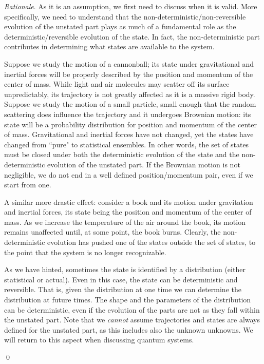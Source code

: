 \documentclass[aps,pra,10pt,twocolumn,floatfix,nofootinbib]{revtex4-1}
\numberwithin{equation}{section}
\theoremstyle{definition}
\newenvironment{rationale}{\emph{Rationale}.}{\qed}
\begin{document}
\begin{rationale}
As it is an assumption, we first need to discuss when it is valid. More specifically, we need to understand that the non-deterministic/non-reversible evolution of the unstated part plays as much of a fundamental role as the deterministic/reversible evolution of the state. In fact, the non-deterministic part contributes in determining what states are available to the system.

Suppose we study the motion of a cannonball; its state under gravitational and inertial forces will be properly described by the position and momentum of the center of mass. While light and air molecules may scatter off its surface unpredictably, its trajectory is not greatly affected as it is a massive rigid body. Suppose we study the motion of a small particle, small enough that the random scattering does influence the trajectory and it undergoes Brownian motion: its state will be a probability distribution for position and momentum of the center of mass. Gravitational and inertial forces have not changed, yet the states have changed from ``pure" to statistical ensembles. In other words, the set of states must be closed under both the deterministic evolution of the state and the non-deterministic evolution of the unstated part. If the Brownian motion is not negligible, we do not end in a well defined position/momentum pair, even if we start from one.

A similar more drastic effect: consider a book and its motion under gravitation and inertial forces, its state being the position and momentum of the center of mass. As we increase the temperature of the air around the book, its motion remains unaffected until, at some point, the book burns. Clearly, the non-deterministic evolution has pushed one of the states outside the set of states, to the point that the system is no longer recognizable.

As we have hinted, sometimes the state is identified by a distribution (either statistical or actual). Even in this case, the state can be deterministic and reversible. That is, given the distribution at one time we can determine the distribution at future times. The shape and the parameters of the distribution can be deterministic, even if the evolution of the parts are not as they fall within the unstated part. Note that we \emph{cannot} assume trajectories and states are always defined for the unstated part, as this includes also the unknown unknowns. We will return to this aspect when discussing quantum systems.


\end{rationale}
\end{document}
